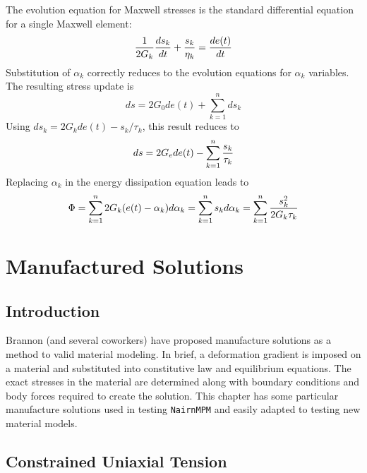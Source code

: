 \documentclass[11pt]{book}
\begin{document}
The evolution equation for Maxwell stresses is the standard differential equation for a single Maxwell element:
\begin{equation}
       {1\over 2G_k} {ds_k\over dt} + {s_k\over\eta_k} = {de(t)\over dt}
\end{equation}
Substitution of $\alpha_k$ correctly reduces to the evolution equations for $\alpha_k$ variables. The resulting stress update is
\begin{equation}
       ds = 2G_0de(t) + \sum_{k=1}^n ds_k
\end{equation}
Using $ds_k = 2G_kde(t) - s_k/\tau_k$, this result reduces to
\begin{equation}
       ds = 2G_ede(t) - \sum_{k=1}^n {s_k\over \tau_k}
\end{equation}
Replacing $\alpha_k$ in the energy dissipation equation leads to
\begin{equation}
     \Phi = \sum_{k=1}^n 2G_k(e(t)-\alpha_k)d\alpha_k = \sum_{k=1}^n s_kd\alpha_k = \sum_{k=1}^n {s_k^2\over 2G_k\tau_k}
\end{equation}





\chapter{Manufactured Solutions}

\section{Introduction}

Brannon (and several coworkers) have proposed manufacture solutions as a method to valid material modeling. In brief, a deformation gradient is imposed on a material and substituted into constitutive law and equilibrium equations. The exact stresses in the material are determined along with boundary conditions and body forces required to create the solution. This chapter has some particular manufacture solutions used in testing {\tt NairnMPM} and easily adapted to testing new material models.

\section{Constrained Uniaxial Tension}
\end{document}

